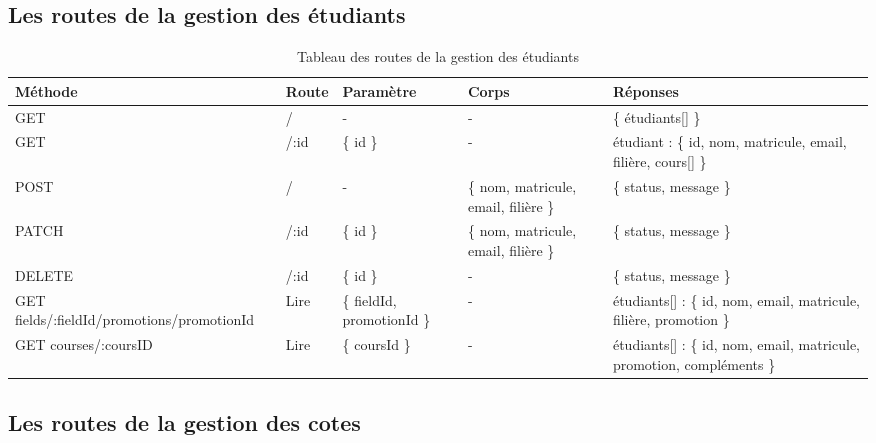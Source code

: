 \subsection{Les routes de la gestion des étudiants}\label{subsec:routes-student}

\begin{table}[ht]
  \caption{Tableau des routes de la gestion des étudiants}
  \label{tab:routes-student}
  \begin{tabular}{|p{1.5cm}|p{1cm}|p{1.5cm}|p{3cm}|p{3.5cm}| }
    \hline
    Méthode & Route & Paramètre & Corps & Réponses \\
    \hline
    GET & / & - & - & \{ étudiants[] \} \\
    \hline
    GET & /:id & \{ id \} & - & étudiant : \{ id, nom, matricule, email, filière, cours[] \} \\
    \hline
    POST & / & - & \{ nom, matricule, email, filière \} & \{ status, message \} \\
    \hline
    PATCH & /:id & \{ id \} & \{ nom, matricule, email, filière \} & \{ status, message \} \\
    \hline
    DELETE & /:id & \{ id \} & - & \{ status, message \} \\
    \hline
    GET fields/:fieldId/promotions/promotionId & Lire & \{ fieldId, promotionId \} & - &  étudiants[] : \{ id, nom, email, matricule, filière, promotion \} \\
    \hline
    GET courses/:coursID & Lire & \{ coursId \} & - &  étudiants[] : \{ id, nom, email, matricule, promotion, compléments \} \\
    \hline
  \end{tabular}
\end{table}
\pagebreak

\subsection{Les routes de la gestion des cotes}\label{subsec:routes-grade}

